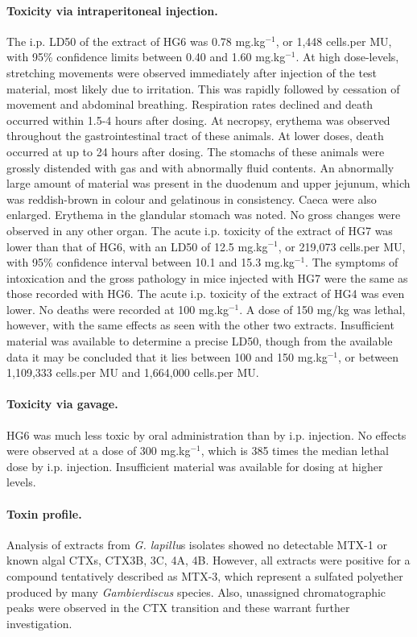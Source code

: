 \documentclass[12pt]{article}
\begin{document}
\paragraph{Toxicity via intraperitoneal injection.}
The i.p. LD50 of the extract of HG6 was 0.78 mg.kg$^{-1}$, or 1,448 cells.per MU, with 95\% confidence limits between 0.40 and 1.60 mg.kg$^{-1}$. 
At high dose-levels, stretching movements were observed immediately after injection of the test material, most likely due to irritation. 
This was rapidly followed by cessation of movement and abdominal breathing. 
Respiration rates declined and death occurred within 1.5-4 hours after dosing. 
At necropsy, erythema was observed throughout the gastrointestinal tract of these animals. 
At lower doses, death occurred at up to 24 hours after dosing. 
The stomachs of these animals were grossly distended with gas and with abnormally fluid contents. 
An abnormally large amount of material was present in the duodenum and upper jejunum, which was reddish-brown in colour and gelatinous in consistency. Caeca were also enlarged. 
Erythema in the glandular stomach was noted. No gross changes were observed in any other organ. 
The acute i.p. toxicity of the extract of HG7 was lower than that of HG6, with an LD50 of 12.5 mg.kg$^{-1}$, or 219,073 cells.per MU, with 95\% confidence interval between 10.1 and 15.3 mg.kg$^{-1}$. 
The symptoms of intoxication and the gross pathology in mice injected with HG7 were the same as those recorded with HG6. 
The acute i.p. toxicity of the extract of HG4 was even lower. 
No deaths were recorded at 100 mg.kg$^{-1}$. 
A dose of 150 mg/kg was lethal, however, with the same effects as seen with the other two extracts. 
Insufficient material was available to determine a precise LD50, though from the available data it may be concluded that it lies between 100 and 150 mg.kg$^{-1}$, or between 1,109,333 cells.per MU
and 1,664,000 cells.per MU.

\paragraph{Toxicity via gavage.}
 HG6 was much less toxic by oral administration than by i.p. injection. 
 No effects were observed at a dose of 300 mg.kg$^{-1}$, which is 385 times the median lethal dose by i.p. injection. 
 Insufficient material was available for dosing at higher levels.​

\paragraph{Toxin profile.}
Analysis of extracts from \textit{G. lapillu}s isolates showed no detectable MTX-1 or known algal CTXs, CTX3B, 3C, 4A, 4B. 
However, all extracts were positive for a compound tentatively described as MTX-3, which represent a sulfated polyether produced by many \textit{Gambierdiscus} species. 
Also, unassigned chromatographic peaks were observed in the CTX transition and these warrant further investigation.
\end{document}
